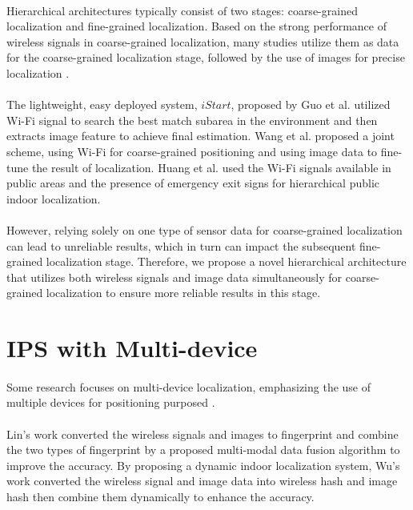 \documentclass[a4paper,12pt]{report}
\begin{document}
\paragraph{}
Hierarchical architectures typically consist of two stages: coarse-grained localization and fine-grained localization. Based on the strong performance of wireless signals in coarse-grained localization, many studies utilize them as data for the coarse-grained localization stage, followed by the use of images for precise localization \cite{wang2020joint,guo2018fusion,huang2020wifi}.
\paragraph{}
The lightweight, easy deployed system, $iStart$, proposed by Guo et al. \cite{guo2018fusion} utilized Wi-Fi signal to search the best match subarea in the environment and then extracts image feature to achieve final estimation. Wang et al. \cite{wang2020joint} proposed a joint scheme, using Wi-Fi for coarse-grained positioning and using image data to fine-tune the result of localization. Huang et al. \cite{huang2020wifi} used the Wi-Fi signals available in public areas and the presence of emergency exit signs for hierarchical public indoor localization.
\paragraph{}
However, relying solely on one type of sensor data for coarse-grained localization can lead to unreliable results, which in turn can impact the subsequent fine-grained localization stage. Therefore, we propose a novel hierarchical architecture that utilizes both wireless signals and image data simultaneously for coarse-grained localization to ensure more reliable results in this stage.
\section{IPS with Multi-device}
\paragraph{}
Some research focuses on multi-device localization, emphasizing the use of multiple devices for positioning purposed \cite{Lin2021,Wu2022}.
\paragraph{}
Lin's work \cite{Lin2021} converted the wireless signals and images to fingerprint and combine the two types of fingerprint by a proposed multi-modal data fusion algorithm to improve the accuracy. By proposing a dynamic indoor localization system, Wu's work \cite{Wu2022} converted the wireless signal and image data into wireless hash and image hash then combine them dynamically to enhance the accuracy.
\end{document}
